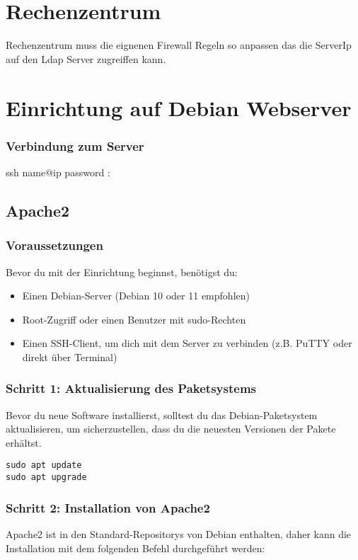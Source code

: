 \documentclass[a4paper,12pt]{article}
\begin{document}
\section{Rechenzentrum}

Rechenzentrum muss die eignenen Firewall Regeln so anpassen das die ServerIp auf den Ldap Server zugreiffen kann.




\section{Einrichtung auf Debian Webserver}

\subsubsection{Verbindung zum Server}

ssh name@ip
password : 

\subsection{Apache2}
\subsubsection{Voraussetzungen}
Bevor du mit der Einrichtung beginnst, benötigst du:
\begin{itemize}
    \item Einen Debian-Server (Debian 10 oder 11 empfohlen)
    \item Root-Zugriff oder einen Benutzer mit sudo-Rechten
    \item Einen SSH-Client, um dich mit dem Server zu verbinden (z.B. PuTTY oder direkt über Terminal)
\end{itemize}

\subsubsection{Schritt 1: Aktualisierung des Paketsystems}
Bevor du neue Software installierst, solltest du das Debian-Paketsystem aktualisieren, um sicherzustellen, dass du die neuesten Versionen der Pakete erhältst.

\begin{lstlisting}
sudo apt update
sudo apt upgrade
\end{lstlisting}

\subsubsection{Schritt 2: Installation von Apache2}
Apache2 ist in den Standard-Repositorys von Debian enthalten, daher kann die Installation mit dem folgenden Befehl durchgeführt werden:
\end{document}
